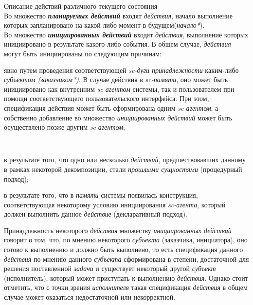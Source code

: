 \begin{frame}{Описание действий различного текущего состояния}
\topline
 \\
\bigskip
    Во множество \textbf{\textit{планируемых действий}} входят \textit{действия}, начало выполнение которых запланировано на какой-либо момент в будущем(\textit{начало*}).\\
    Во множество \textbf{\textit{инициированных действий}} входят \textit{действия}, выполнение которых инициировано в результате какого-либо события.
    В общем случае, \textit{действия} могут быть инициированы по следующим причинам:
    \begin{textitemize}
	   \item явно путем проведения соответствующей \textit{sc-дуги принадлежности} каким-либо \textit{субъектом (заказчиком*)}. В случае действия в \textit{sc-памяти}, оно может быть инициировано как внутренним \textit{sc-агентом} системы, так и пользователем при помощи соответствующего пользовательского интерфейса. При этом, спецификация действия может быть сформирована одним \textit{sc-агентом}, а собственно добавление во множество \textit{инициированных действий} может быть осуществлено позже другим \textit{sc-агентом};
    \end{textitemize}
    \end{frame}
    \begin{frame}{}
     \\
     \bigskip
    \begin{textitemize}
    \item в результате того, что одно или несколько \textit{действий}, предшествовавших данному в рамках некоторой декомпозиции, стали \textit{прошлыми сущностями} (процедурный подход);
	   \item в результате того, что в \textit{памяти} системы появилась конструкция, соответствующая некоторому условию инициирования \textit{sc-агента}, который должен выполнить данное \textit{действие} (декларативный подход).
\end{textitemize}
    Принадлежность некоторого \textit{действия} множеству \textit{инициированных действий} говорит о том, что, по мнению некоторого \textit{субъекта} (заказчика, инициатора), оно готово к выполнению и должно быть выполнено, то есть спецификация данного \textit{действия} по мнению данного \textit{субъекта} сформирована в степени, достаточной для решения поставленной \textit{задачи} и существует некоторый другой \textit{субъект} (исполнитель), который может приступать к выполнению \textit{действия}. Однако стоит отметить, что с точки зрения \textit{исполнителя} такая спецификация \textit{действия} в общем случае может оказаться недостаточной или некорректной.\\
\end{frame}
